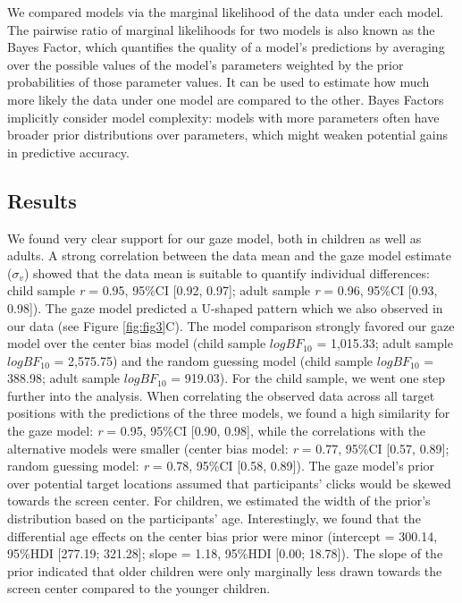 \documentclass[
  man,mask,floatsintext]{apa7}
\begin{document}
We compared models via the marginal likelihood of the data under each model. The pairwise ratio of marginal likelihoods for two models is also known as the Bayes Factor, which quantifies the quality of a model's predictions by averaging over the possible values of the model's parameters weighted by the prior probabilities of those parameter values. It can be used to estimate how much more likely the data under one model are compared to the other. Bayes Factors implicitly consider model complexity: models with more parameters often have broader prior distributions over parameters, which might weaken potential gains in predictive accuracy.

\hypertarget{results-1}{%
\subsection{Results}\label{results-1}}

We found very clear support for our gaze model, both in children as well as adults. A strong correlation between the data mean and the gaze model estimate (\(\sigma_v\)) showed that the data mean is suitable to quantify individual differences: child sample \emph{r} = 0.95, 95\%CI {[}0.92, 0.97{]}; adult sample \emph{r} = 0.96, 95\%CI {[}0.93, 0.98{]}). The gaze model predicted a U-shaped pattern which we also observed in our data (see Figure \ref{fig:fig3}C). The model comparison strongly favored our gaze model over the center bias model (child sample \(logBF_{10}\) = 1,015.33; adult sample \(logBF_{10}\) = 2,575.75) and the random guessing model (child sample \(logBF_{10}\) = 388.98; adult sample \(logBF_{10}\) = 919.03). For the child sample, we went one step further into the analysis. When correlating the observed data across all target positions with the predictions of the three models, we found a high similarity for the gaze model: \emph{r} = 0.95, 95\%CI {[}0.90, 0.98{]}, while the correlations with the alternative models were smaller (center bias model: \emph{r} = 0.77, 95\%CI {[}0.57, 0.89{]}; random guessing model: \emph{r} = 0.78, 95\%CI {[}0.58, 0.89{]}). The gaze model's prior over potential target locations assumed that participants' clicks would be skewed towards the screen center. For children, we estimated the width of the prior's distribution based on the participants' age. Interestingly, we found that the differential age effects on the center bias prior were minor (intercept = 300.14, 95\%HDI {[}277.19; 321.28{]}; slope = 1.18, 95\%HDI {[}0.00; 18.78{]}). The slope of the prior indicated that older children were only marginally less drawn towards the screen center compared to the younger children.
\end{document}

